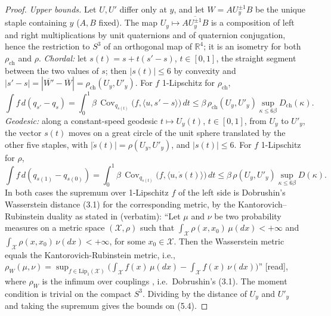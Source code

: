 \documentclass[11pt,a4paper]{article}
\theoremstyle{remark}
\theoremstyle{definition}
\newcommand{\R}{\mathbb{R}}
\newcommand{\Cov}{\operatorname{Cov}}
\newcommand{\st}[1]{\textsf{[#1]}}
\newcommand{\Dch}{D_{\mathrm{ch}}}
\newcommand{\rch}{\rho_{\mathrm{ch}}}
\begin{document}
\begin{proof}
\emph{Upper bounds.} Let $U,U'$ differ only at $y$, and let $W=AU_y^{\pm1}B$ be the unique staple
containing $y$ ($A,B$ fixed). The map $U_y\mapsto\overline{AU_y^{\pm1}B}$ is a composition of left and right
multiplications by unit quaternions and of quaternion conjugation, hence the restriction to $S^3$ of an
orthogonal map of $\R^4$; it is an isometry for both $\rch$ and $\rho$.
\emph{Chordal:} let $s(t)=s+t(s'-s)$, $t\in[0,1]$, the straight segment between the two values of $s$; then
$|s(t)|\le6$ by convexity and $|s'-s|=|\overline{W'}-\overline W|=\rch(U_y,U'_y)$. For $f$ 1-Lipschitz for $\rch$,
\[
\int f\,d(q_{s'}-q_{s})=\int_0^1\beta\,\Cov_{q_{s(t)}}\big(f,\langle u,s'-s\rangle\big)\,dt
\le\beta\,\rch(U_y,U'_y)\sup_{\kappa\le6\beta}\Dch(\kappa).
\]
\emph{Geodesic:} along a constant-speed geodesic $t\mapsto U_y(t)$, $t\in[0,1]$, from
$U_y$ to $U'_y$, the vector $s(t)$ moves on a great circle of the unit sphere translated by the
other five staples, with $|\dot s(t)|=\rho(U_y,U'_y)$, and $|s(t)|\le6$. For $f$ 1-Lipschitz for $\rho$,
\[
\int f\,d(q_{s(1)}-q_{s(0)})=\int_0^1\beta\,\Cov_{q_{s(t)}}\big(f,\langle u,\dot s(t)\rangle\big)\,dt
\le\beta\,\rho(U_y,U'_y)\sup_{\kappa\le6\beta}D(\kappa).
\]
In both cases the supremum over 1-Lipschitz $f$ of the left side is Dobrushin's Wasserstein distance (3.1)
for the corresponding metric, by the Kantorovich--Rubinstein duality as stated in \cite[Thm~10.8, p.~53]{DS25} (verbatim):
``Let $\mu$ and $\nu$ be two probability measures on a metric space $(\mathcal X,\rho)$ such that
$\int_{\mathcal X}\rho(x,x_0)\,\mu(dx)<+\infty$ and $\int_{\mathcal X}\rho(x,x_0)\,\nu(dx)<+\infty$, for some
$x_0\in\mathcal X$. Then the Wasserstein metric equals the Kantorovich-Rubinstein metric, i.e.,
$\rho_W(\mu,\nu)=\sup_{f\in\mathrm{Lip}_1(\mathcal X)}\big(\int_{\mathcal X}f(x)\,\mu(dx)-\int_{\mathcal X}f(x)\,\nu(dx)\big)$''
\st{read}, where $\rho_W$ is the infimum over couplings \cite[(2.1), p.~6]{DS25}, i.e.\ Dobrushin's (3.1).
The moment condition is trivial on the compact $S^3$. Dividing by the distance of $U_y$ and $U'_y$ and taking the
supremum gives the bounds on (5.4).


\end{proof}
\end{document}
